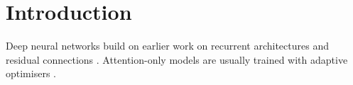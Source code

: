 \section{Introduction}

Deep neural networks \citep{lecun2015deep} build on earlier work on recurrent
architectures \citep{hochreiter1997lstm} and residual connections
\citep{he2016resnet}. Attention-only models \citet{vaswani2017attention} are
usually trained with adaptive optimisers \citep{kingma2015adam}.
